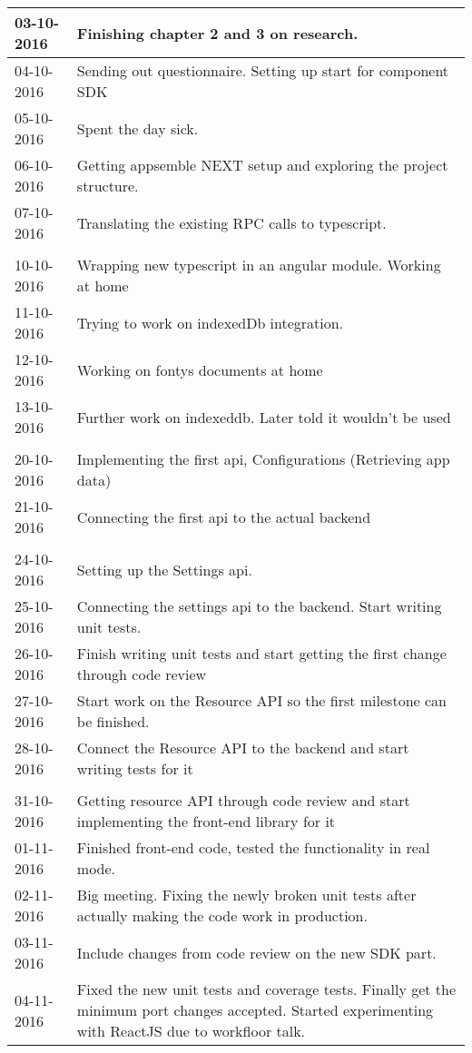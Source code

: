 \begin{tabular}{|p{2cm}|p{11cm}|}
	\hline
	03-10-2016 &  Finishing chapter 2 and 3 on research. \\ \hline
	04-10-2016 &  Sending out questionnaire. Setting up start for component SDK \\ \hline
	05-10-2016 &  Spent the day sick. \\ \hline
	06-10-2016 &  Getting appsemble NEXT setup and exploring the project structure. \\ \hline
	07-10-2016 &  Translating the existing RPC calls to typescript. \\ \hline
	
	\\ \hline
	
	10-10-2016 &  Wrapping new typescript in an angular module. Working at home \\ \hline
	11-10-2016 &  Trying to work on indexedDb integration. \\ \hline
	12-10-2016 &  Working on fontys documents at home \\ \hline
	13-10-2016 &  Further work on indexeddb. Later told it wouldn't be used \\ \hline
	
	\\ \hline
	
	20-10-2016 &  Implementing the first api, Configurations (Retrieving app data) \\ \hline
	21-10-2016 &  Connecting the first api to the actual backend \\ \hline
	
	\\ \hline
	
	24-10-2016 &  Setting up the Settings api. \\ \hline
	25-10-2016 &  Connecting the settings api to the backend. Start writing unit tests. \\ \hline
	26-10-2016 &  Finish writing unit tests and start getting the first change through code review \\ \hline
	27-10-2016 &  Start work on the Resource API so the first milestone can be finished. \\ \hline
	28-10-2016 &  Connect the Resource API to the backend and start writing tests for it \\ \hline
	
	\\ \hline
	
	31-10-2016 &  Getting resource API through code review and start implementing the front-end library for it \\ \hline
	01-11-2016 &  Finished front-end code, tested the functionality in real mode. \\ \hline
	02-11-2016 &  Big meeting. Fixing the newly broken unit tests after actually making the code work in production. \\ \hline
	03-11-2016 &  Include changes from code review on the new SDK part. \\ \hline
	04-11-2016 &  Fixed the new unit tests and coverage tests. Finally get the minimum port changes accepted. Started experimenting with ReactJS due to workfloor talk. \\ \hline
	

\end{tabular}
